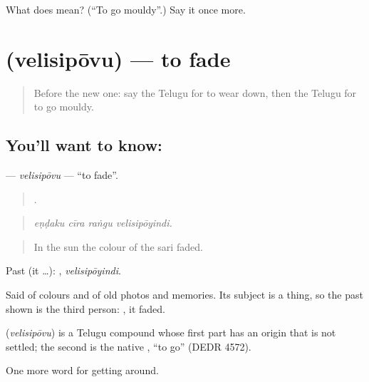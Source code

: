 \begin{tcolorbox}[breakable,colback=teal!4,colframe=teal!35!black,title={Before you move on}]
What does  mean? (\textquotedblleft{}To go mouldy\textquotedblright{}.) Say it once more.
\end{tcolorbox}
\section[\texorpdfstring{\te{వెలిసిపోవు} (velisipōvu)}{వెలిసిపోవు (velisipōvu)}]{ (velisipōvu) — to fade}

\label{lesson:TE-C491-velisipovu}



\begin{quote}
Before the new one: say the Telugu for to wear down, then the Telugu for to go mouldy.
\end{quote}

\subsection*{You'll want to know: }
\textbf{} — \emph{velisipōvu} — \textquotedblleft{}to fade\textquotedblright{}.

\begin{quote}
   .
\end{quote}

\begin{quote}
\emph{eṇḍaku cīra raṅgu velisipōyindi.}
\end{quote}

\begin{quote}
In the sun the colour of the sari faded.
\end{quote}

Past (it …): , \emph{velisipōyindi}.

Said of colours and of old photos and memories. Its subject is a thing, so the past shown is the third person: , it faded.

\begin{cousinweb}
\textbf{} (\emph{velisipōvu}) is a Telugu compound whose first part has an origin that is not settled; the second is the native , \textquotedblleft{}to go\textquotedblright{} (DEDR 4572).
\end{cousinweb}

\begin{grammarlens}[title={What you've built}]
One more word for getting around.
\end{grammarlens}

